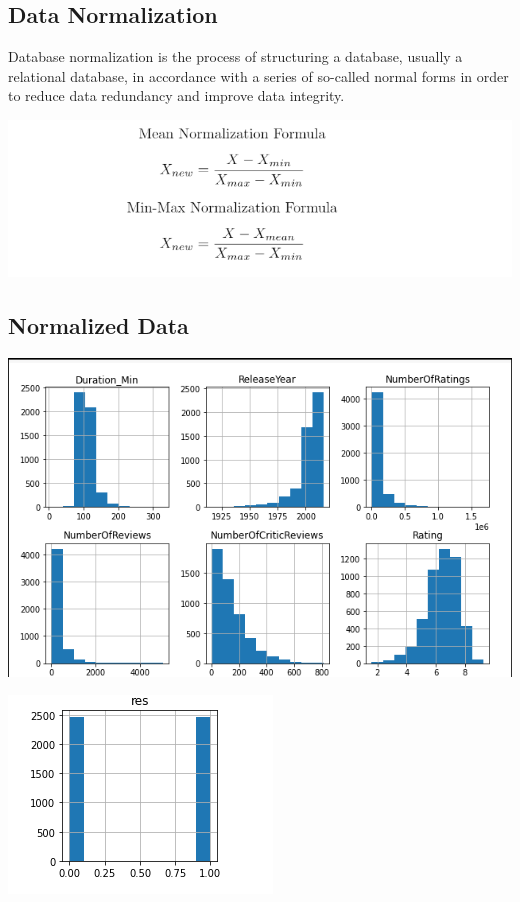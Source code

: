 \documentclass{article}
\begin{document}
\subsection{Data Normalization}
Database normalization is the process of structuring a database, usually a relational database, in accordance with a series of so-called normal forms in order to reduce data redundancy and improve data integrity.
\begin{figure}
\end{figure}
\begin{center}
\includegraphics[scale=0.5]{Normalization.png}
\label{figure}
\end{center}
\subsection{Normalized Data}
\begin{center}
\includegraphics[scale=0.5]{Graph.png}
\label{figure}
\end{center}
\begin{figure}
\end{figure}
\begin{center}
\includegraphics[scale=0.5]{Graph1}
\label{figure}
\end{center}
\end{document}
